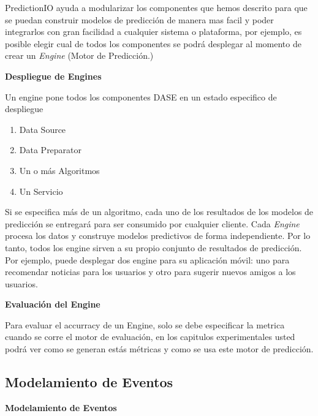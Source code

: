 PredictionIO ayuda a modularizar los componentes que hemos descrito  para que se puedan construir modelos de predicción de manera mas facil y poder integrarlos con gran facilidad a cualquier sistema o plataforma, por ejemplo, es posible elegir cual de todos los componentes se podrá desplegar al momento de crear un \emph{Engine} (Motor de Predicción.)




\textbf{Despliegue de Engines}

  Un engine pone todos los componentes DASE en un estado especifico de despliegue

  \begin{enumerate}
    \item Data Source
    \item Data Preparator
    \item Un o más Algoritmos
    \item Un Servicio

  \end{enumerate}

  Si se especifica más de un algoritmo, cada uno de los resultados de los modelos de predicción se entregará para ser consumido por cualquier cliente.
  Cada \emph{Engine} procesa los datos y construye modelos predictivos de forma independiente. Por lo tanto, todos los engine sirven a su propio conjunto de resultados de predicción. Por ejemplo, puede desplegar dos engine para su aplicación móvil: uno para recomendar noticias para los usuarios y otro para sugerir nuevos amigos a los usuarios.



\textbf{Evaluación del Engine }

  Para evaluar el accurracy de un Engine, solo se debe especificar la metrica cuando se corre el motor de evaluación, en los capitulos experimentales usted podrá ver como se generan estás métricas y como se usa este motor de predicción.











  \subsection{Modelamiento de Eventos}



\textbf{Modelamiento de Eventos}

